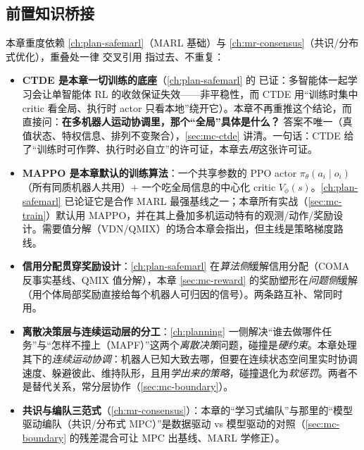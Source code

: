 \subsection*{前置知识桥接}
本章重度依赖 \cref{ch:plan-safemarl}（MARL 基础）与 \cref{ch:mr-consensus}（共识/分布式优化），重叠处一律 交叉引用 指过去、不重复：
\begin{itemize}
  \item \textbf{CTDE 是本章一切训练的底座}（\cref{ch:plan-safemarl} 的  已证：多智能体一起学习会让单智能体 RL 的收敛保证失效——非平稳性，而 CTDE 用“训练时集中 critic 看全局、执行时 actor 只看本地”绕开它）。本章不再重推这个结论，而直接问：\textbf{在多机器人运动协调里，那个“全局”具体是什么？} 答案不唯一（真值状态、特权信息、排列不变聚合），\cref{sec:mc-ctde} 讲清。一句话：CTDE 给了“训练时可作弊、执行时必自立”的许可证，本章去\emph{用}这张许可证。
  \item \textbf{MAPPO 是本章默认的训练算法}：一个共享参数的 PPO actor $\pi_\theta(a_i\mid o_i)$（所有同质机器人共用）$+$ 一个吃全局信息的中心化 critic $V_\phi(s)$。\cref{ch:plan-safemarl} 已论证它是合作 MARL 最强基线之一\cite{yu2022mappo}；本章所有实战（\cref{sec:mc-train}）默认用 MAPPO，并在其上叠加多机运动特有的观测/动作/奖励设计。需要值分解（VDN/QMIX\cite{sunehag2018vdn,rashid2018qmix}）的场合本章会指出，但主线是策略梯度路线。
  \item \textbf{信用分配贯穿奖励设计}：\cref{ch:plan-safemarl} 在\emph{算法侧}缓解信用分配（COMA 反事实基线\cite{foerster2018coma}、QMIX 值分解），本章 \cref{sec:mc-reward} 的奖励塑形在\emph{问题侧}缓解（用个体局部奖励直接给每个机器人可归因的信号）。两条路互补、常同时用。
  \item \textbf{离散决策层与连续运动层的分工}：\cref{ch:planning} 一侧解决“谁去做哪件任务”与“怎样不撞上（MAPF）”这两个\emph{离散决策}问题，碰撞是\emph{硬约束}。本章处理其下的\emph{连续运动协调}：机器人已知大致去哪，但要在连续状态空间里实时协调速度、躲避彼此、维持队形，且用\emph{学出来的策略}，碰撞退化为\emph{软惩罚}。两者不是替代关系，常分层协作（\cref{sec:mc-boundary}）。
  \item \textbf{共识与编队三范式}（\cref{ch:mr-consensus}）：本章的“学习式编队”与那里的“模型驱动编队（共识/分布式 MPC）”是数据驱动 vs 模型驱动的对照（\cref{sec:mc-boundary} 的残差混合可让 MPC 出基线、MARL 学修正）。
\end{itemize}

